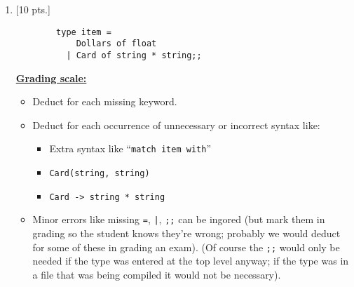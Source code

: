 \documentclass[11pt,fleqn]{article}
\begin{document}
  \begin{enumerate}

    \addtolength{\itemsep}{20mm}

    \item {[10 pts.]}

          \vspace{-2mm}

          \begin{Verbatim}
        type item =
            Dollars of float
          | Card of string * string;;
          \end{Verbatim}

          \vspace{-3mm}

          \begin{info}{\textbf{\underline{Grading scale:}}}

            \begin{itemize}

              \addtolength{\itemsep}{2mm}

              \item Deduct  for each missing keyword.

              \item Deduct  for each occurrence of
                    unnecessary or incorrect syntax like:

                    \vspace{0mm}

                    \begin{itemize}

                      \addtolength{\itemsep}{-.5mm}

                      \item Extra syntax like ``\texttt{match item with}''

                      \item \texttt{Card(string, string)}

                      \item \texttt{Card -> string * string}

                    \end{itemize}

                    \vspace{0mm}

              \item Minor errors like missing \texttt{=}, \texttt{|},
                    \texttt{;;} can be ingored (but mark them in grading so
                    the student knows they're wrong; probably we would
                    deduct for some of these in grading an exam).  (Of
                    course the \texttt{;;} would only be needed if the type
                    was entered at the top level anyway; if the type was in
                    a file that was being compiled it would not be
                    necessary).


\end{itemize}
\end{info}
\end{enumerate}
\end{document}
